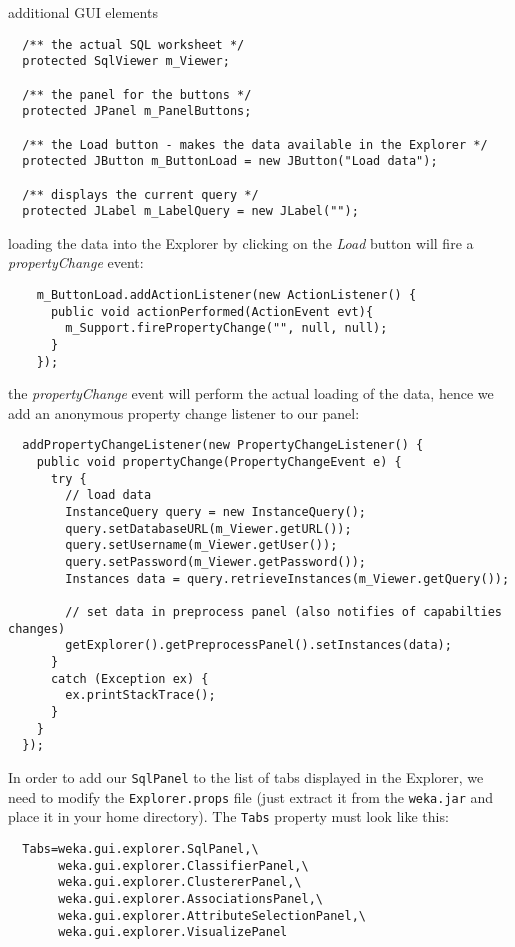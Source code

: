 \begin{tight_itemize}
  \newpage
  \item additional GUI elements
  \begin{verbatim}
  /** the actual SQL worksheet */
  protected SqlViewer m_Viewer;

  /** the panel for the buttons */
  protected JPanel m_PanelButtons;

  /** the Load button - makes the data available in the Explorer */
  protected JButton m_ButtonLoad = new JButton("Load data");

  /** displays the current query */
  protected JLabel m_LabelQuery = new JLabel("");
  \end{verbatim}

  \item loading the data into the Explorer by clicking on the \textit{Load}
button will fire a \textit{propertyChange} event:
  \begin{verbatim}
    m_ButtonLoad.addActionListener(new ActionListener() {
      public void actionPerformed(ActionEvent evt){
        m_Support.firePropertyChange("", null, null);
      }
    });
  \end{verbatim}

  \item the \textit{propertyChange} event will perform the actual loading of the
data, hence we add an anonymous property change listener to our panel:
  \begin{verbatim}
  addPropertyChangeListener(new PropertyChangeListener() {
    public void propertyChange(PropertyChangeEvent e) {
      try {
        // load data
        InstanceQuery query = new InstanceQuery();
        query.setDatabaseURL(m_Viewer.getURL());
        query.setUsername(m_Viewer.getUser());
        query.setPassword(m_Viewer.getPassword());
        Instances data = query.retrieveInstances(m_Viewer.getQuery());

        // set data in preprocess panel (also notifies of capabilties changes)
        getExplorer().getPreprocessPanel().setInstances(data);
      }
      catch (Exception ex) {
        ex.printStackTrace();
      }
    }
  });
  \end{verbatim}

  \item In order to add our \texttt{SqlPanel} to the list of tabs displayed in
the Explorer, we need to modify the \texttt{Explorer.props} file (just extract
it from the \texttt{weka.jar} and place it in your home directory). The
\texttt{Tabs} property must look like this:
  \begin{verbatim}
  Tabs=weka.gui.explorer.SqlPanel,\
       weka.gui.explorer.ClassifierPanel,\
       weka.gui.explorer.ClustererPanel,\
       weka.gui.explorer.AssociationsPanel,\
       weka.gui.explorer.AttributeSelectionPanel,\
       weka.gui.explorer.VisualizePanel
  \end{verbatim}
\end{tight_itemize}

